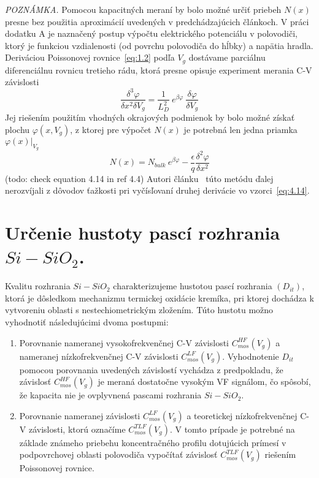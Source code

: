 \begin{minipage}[c]{\textwidth}
  \emph{POZNÁMKA.} Pomocou kapacitných meraní by bolo možné určiť
  priebeh $N(x)$ presne bez použitia aproximácií uvedených v
  predchádzajúcich článkoch.  V práci~\cite{4.4} dodatku A je
  naznačený postup výpočtu elektrického potenciálu v polovodiči, ktorý
  je funkciou vzdialenosti (od povrchu polovodiča do hĺbky) a napätia
  hradla.  Deriváciou Poissonovej rovnice~\ref{eq:1.2} podľa $V_{g}$
  dostávame parciálnu diferenciálnu rovnicu tretieho rádu, ktorá
  presne opisuje experiment merania C-V závislosti
  \begin{equation}\label{eq:4.13}
    \frac{\delta^{3}\varphi}{\delta x^{2}\delta V_{g}} = {\frac{1}{L_{D}^{2}}}\ {e^{\beta\varphi}}\ {\frac{\delta\varphi}{\delta V_{g}}}
  \end{equation}
  Jej riešením použitím vhodných okrajových podmienok by bolo možné
  získať plochu $\varphi(x,V_{g})$, z ktorej pre výpočet $N(x)$ je
  potrebná len jedna priamka $\varphi(x)\rvert_{V_{g}}$
  \begin{equation}\label{eq:4.14}
    N(x) = N_{bulk}\ e^{\beta\varphi}-\frac{\epsilon}{q}\frac{\delta^{2}\varphi}{\delta x^{2}}
  \end{equation}
  (todo: check equation 4.14 in ref 4.4)
  Autori článku~\cite{4.4} túto metódu ďalej nerozvíjali z dôvodov
  ťažkosti pri vyčísľovaní druhej derivácie vo vzorci~\ref{eq:4.14}.
\end{minipage}

\section{Určenie hustoty pascí rozhrania $Si-SiO_{2}$.}\label{sec:4.2}

Kvalitu rozhrania $Si-SiO_{2}$ charakterizujeme hustotou pascí
rozhrania $(D_{it})$, ktorá je dôsledkom mechanizmu termickej oxidácie
kremíka, pri ktorej dochádza k vytvoreniu oblasti s nestechiometrickým
zložením. Túto hustotu možno vyhodnotiť následujúcimi dvoma postupmi:

\begin{enumerate}
\item Porovnanie nameranej vysokofrekvenčnej C-V závislosti
  $C_{mos}^{HF}(V_{g})$ a nameranej nízkofrekvenčnej C-V závislosti
  $C_{mos}^{LF}(V_{g})$. Vyhodnotenie $D_{it}$ pomocou porovnania
  uvedených závislostí vychádza z predpokladu, že závislosť
  $C_{mos}^{HF}(V_{g})$ je meraná dostatočne vysokým VF signálom, čo
  spôsobí, že kapacita nie je ovplyvnená pascami rozhrania
  $Si-SiO_{2}$.
\item Porovnanie nameranej závislosti $C_{mos}^{LF}(V_{g})$ a
  teoretickej nízkofrekvenčnej C-V závislosti, ktorú označíme
  $C_{mos}^{TLF}(V_{g})$.  V tomto prípade je potrebné na základe
  známeho priebehu koncentračného profilu dotujúcich prímesí v
  podpovrchovej oblasti polovodiča vypočítať závislosť
  $C_{mos}^{TLF}(V_{g})$ riešením Poissonovej rovnice.
\end{enumerate}

